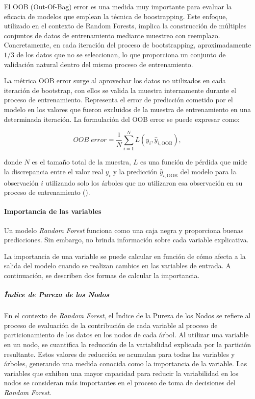El OOB (Out-Of-Bag) error es una medida muy importante para evaluar la eficacia de modelos que emplean la técnica de boostrapping. Este enfoque,  utilizado en el contexto de Random Forests, implica la construcción de múltiples conjuntos de datos de entrenamiento mediante muestreo con reemplazo. Concretamente, en cada iteración del proceso de bootstrapping, aproximadamente \(1/3\) de los datos que no se seleccionan, lo que proporciona un conjunto de validación natural dentro del mismo proceso de entrenamiento. 

La métrica OOB error surge al aprovechar los datos no utilizados en cada iteración de bootstrap, con ellos se valida la muestra internamente durante el proceso de entrenamiento. Representa el error de predicción cometido por el modelo en los valores que fueron excluidos de la muestra de entrenamiento en una determinada iteración. La formulación del OOB error se puede expresar como:

\[
OOB\; error = \frac{1}{N} \sum_{i=1}^{N} L(y_i, \hat{y}_{i,\text{OOB}})
,\]

donde \(N\) es el tamaño total de la muestra, \(L\) es una función de pérdida que mide la discrepancia entre el valor real \(y_i\) y la predicción \(\hat{y}_{i,\text{OOB}}\) del modelo para la observación \(i\) utilizando solo los árboles que no utilizaron esa observación en su proceso de entrenamiento (\cite{james2013introduction}).


\paragraph{Importancia de las variables}\label{sec:importancia-variables}

Un modelo \textit{Random Forest} funciona como una caja negra y proporciona buenas predicciones. Sin embargo, no brinda información sobre cada variable explicativa.

La importancia de una variable se puede calcular en función de cómo afecta a la salida del modelo cuando se realizan cambios en las variables de entrada. A continuación, se describen dos formas de calcular la importancia.

\subparagraph{Índice de Pureza de los Nodos}

En el contexto de \textit{Random Forest}, el Índice de la Pureza de los Nodos se refiere al proceso de evaluación de la contribución de cada variable al proceso de particionamiento de los datos en los nodos de cada árbol. Al utilizar una variable en un nodo, se cuantifica la reducción de la variabilidad explicada por la partición resultante. Estos valores de reducción se acumulan para todas las variables y árboles, generando una medida conocida como la importancia de la variable. Las variables que exhiben una mayor capacidad para reducir la variabilidad en los nodos se consideran más importantes en el proceso de toma de decisiones del \textit{Random Forest}.

